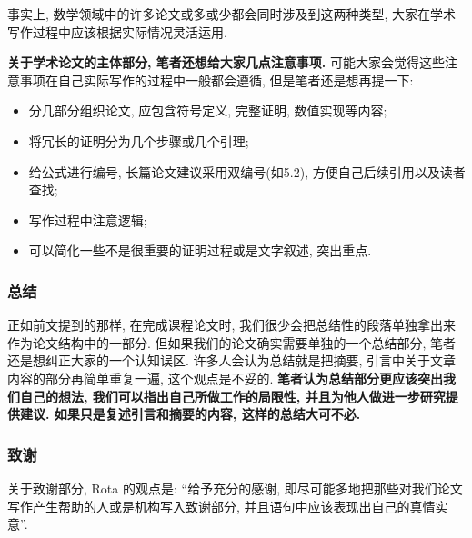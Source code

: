 \documentclass{booki}
\begin{document}
\par 事实上, 数学领域中的许多论文或多或少都会同时涉及到这两种类型, 大家在学术写作过程中应该根据实际情况灵活运用.
\par \textbf{关于学术论文的主体部分, 笔者还想给大家几点注意事项.} 可能大家会觉得这些注意事项在自己实际写作的过程中一般都会遵循, 但是笔者还是想再提一下:
\begin{itemize}
    \item 分几部分组织论文, 应包含符号定义, 完整证明, 数值实现等内容{;}
    \item 将冗长的证明分为几个步骤或几个引理{;}
    \item 给公式进行编号, 长篇论文建议采用双编号(如5.2), 方便自己后续引用以及读者查找{;}
    \item 写作过程中注意逻辑{;}
    \item 可以简化一些不是很重要的证明过程或是文字叙述, 突出重点{.}
\end{itemize}
\subsubsection{总结}
正如前文提到的那样, 在完成课程论文时, 我们很少会把总结性的段落单独拿出来作为论文结构中的一部分. 但如果我们的论文确实需要单独的一个总结部分, 笔者还是想纠正大家的一个认知误区. 许多人会认为总结就是把摘要, 引言中关于文章内容的部分再简单重复一遍, 这个观点是不妥的. \textbf{笔者认为总结部分更应该突出我们自己的想法, 我们可以指出自己所做工作的局限性, 并且为他人做进一步研究提供建议. 如果只是复述引言和摘要的内容, 这样的总结大可不必.}
\subsubsection{致谢}
关于致谢部分, Rota 的观点是: ``给予充分的感谢, 即尽可能多地把那些对我们论文写作产生帮助的人或是机构写入致谢部分, 并且语句中应该表现出自己的真情实意''\cite{RotaTen1997}. 
\end{document}
